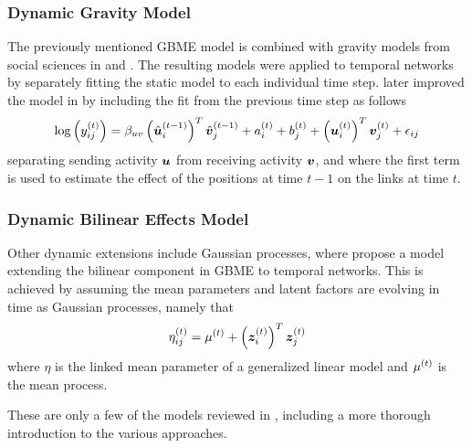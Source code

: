     \subsubsection{Dynamic Gravity Model}
    
        The previously mentioned GBME model is combined with gravity models from social sciences in \citeauthor{ward2007commerce} \cite{ward2007commerce} and \citeauthor{ward2007peace} \cite{ward2007peace}. The resulting models were applied to temporal networks by separately fitting the static model to each individual time step. \citeauthor{ward2013gravity} later improved the model in \cite{ward2013gravity} by including the fit from the previous time step as follows
        \begin{equation}
            \log\left(\sub(y)^\t\right) = \beta_{uv} \left(\hat{\u}_i^{(t-1)}\right)^T \hat{\v}_j^{(t-1)} + a_i^\t + b_j^\t + \left(\u_i^\t\right)^T \v_j^\t + \sub(\epsilon)
        \end{equation}
        separating sending activity $\bm{u}$ from receiving activity $\bm{v}$, and where the first term is used to estimate the effect of the positions at time $t-1$ on the links at time $t$.
        
    \subsubsection{Dynamic Bilinear Effects Model}
    
        Other dynamic extensions include Gaussian processes, where \citeauthor{durante2014bayesian} \cite{durante2014bayesian,durante2014nonparametric} propose a model extending the bilinear component in GBME to temporal networks. This is achieved by assuming the mean parameters and latent factors are evolving in time as Gaussian processes, namely that
        \begin{equation}
            \sub(\eta)^\t = \mu^\t + \left(\z_i^\t\right)^T \z_j^\t
        \end{equation}
        where $\eta$ is the linked mean parameter of a generalized linear model and $\mu^{(t)}$ is the mean process.
        
        These are only a few of the models reviewed in \cite{kim2018review}, including a more thorough introduction to the various approaches.
    


